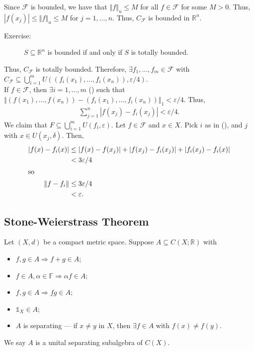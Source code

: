 \documentclass[9pt]{extarticle}
\newcommand{\R}{\mathbb{R}}
\newcommand{\norm}[1]{\left\Vert #1 \right\Vert}
\begin{document}
\begin{description}
      Since $\mathcal{F}$ is bounded, we have that $\norm{f}_u \leq M$ for all $f\in \mathcal{F}$ for some $M>0$. Thus, $|f(x_j)|\leq \norm{f}_u \leq M$ for $j = 1,\dots,n$. Thus, $C_{\mathcal{F}}$ is bounded in $\R^n$.
      \begin{description}
        \item[Exercise:] $S\subseteq \R^n$ is bounded if and only if $S$ is totally bounded.
      \end{description}
      Thus, $C_{\mathcal{F}}$ is totally bounded. Therefore, $\exists f_1,\dots,f_m\in \mathcal{F}$ with $C_{\mathcal{F}}\subseteq \bigcup_{i=1}^{m}U\left(\left(f_i(x_1),\dots,f_i(x_n)\right),\varepsilon/4\right)$.\\

      If $f\in \mathcal{F}$, then $\exists i = 1,\dots,m$ (\textasteriskcentered) such that $\norm{\left(f(x_1),\dots,f(x_n)\right)-\left(f_i(x_1),\dots,f_i(x_n)\right)}_1 < \varepsilon/4$. Thus,
      \begin{align*}
        \sum_{j=1}^{n}|f(x_j)-f_i(x_j)| < \varepsilon/4.
      \end{align*}
      We claim that $F\subseteq \bigcup_{i=1}^{m}U(f_i,\varepsilon)$. Let $f\in \mathcal{F}$ and $x\in X$. Pick $i$ as in (\textasteriskcentered), and $j$ with $x\in U(x_j,\delta)$. Then,
      \begin{align*}
        |f(x)-f_i(x)| &\leq |f(x)-f(x_j)| + |f(x_j)-f_i(x_j)| + |f_i(x_j)-f_i(x)|\\
                      &< 3\varepsilon/4\\
                      \intertext{so}
        \norm{f-f_i} &\leq 3\varepsilon/4\\
                     &< \varepsilon.
      \end{align*}
  \end{description}
  \subsection{Stone-Weierstrass Theorem}%
  Let $(X,d)$ be a compact metric space. Suppose $A\subseteq C(X;\R)$ with
  \begin{itemize}
    \item $f,g\in A \Rightarrow f + g\in A$;
    \item $f\in A,\alpha\in \mathbb{F}\Rightarrow \alpha f \in A$;
    \item $f,g\in A\Rightarrow fg\in A$;
    \item $\mathbb{1}_X \in A$;
    \item $A$ is separating --- if $x\neq y$ in $X$, then $\exists f\in A$ with $f(x)\neq f(y)$.
  \end{itemize}
  We say $A$ is a unital separating subalgebra of $C(X)$.\\
\end{document}
